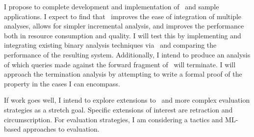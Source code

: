 I propose to complete development and implementation of \sysname\ and sample applications.
I expect to find that \sysname\ improves the ease of integration of multiple analyses, allows for simpler incremental analysis, and improves the performance both in resource consumption and quality.
I will test this by implementing and integrating existing binary analysis techniques via \sysname\ and comparing the performance of the resulting system.
Additionally, I intend to produce an analysis of which queries made against the forward fragment of \sysname\ will terminate.
I will approach the termination analysis by attempting to write a formal proof of the property in the cases I can encompass.

If work goes well, I intend to explore extensions to \sysname\ and more complex evaluation strategies as a stretch goal.
Specific extensions of interest are retraction and circumscription.
For evaluation strategies, I am considering a tactics and ML-based approaches to evaluation.
